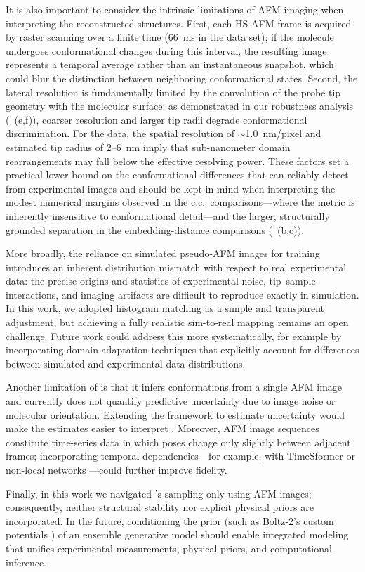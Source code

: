 It is also important to consider the intrinsic limitations of AFM imaging when interpreting the reconstructed structures.
First, each HS-AFM frame is acquired by raster scanning over a finite time (66~ms in the \flhac data set); if the molecule undergoes conformational changes during this interval, the resulting image represents a temporal average rather than an instantaneous snapshot, which could blur the distinction between neighboring conformational states.
Second, the lateral resolution is fundamentally limited by the convolution of the probe tip geometry with the molecular surface; as demonstrated in our robustness analysis (~(e,f)), coarser resolution and larger tip radii degrade conformational discrimination.
For the \flhac data, the spatial resolution of $\sim$1.0~nm/pixel and estimated tip radius of 2--6~nm imply that sub-nanometer domain rearrangements may fall below the effective resolving power.
These factors set a practical lower bound on the conformational differences that \Model can reliably detect from experimental images and should be kept in mind when interpreting the modest numerical margins observed in the c.c.\ comparisons---where the metric is inherently insensitive to conformational detail---and the larger, structurally grounded separation in the embedding-distance comparisons (~(b,c)).

More broadly, the reliance on simulated pseudo-AFM images for training introduces an inherent distribution mismatch with respect to real experimental data: the precise origins and statistics of experimental noise, tip--sample interactions, and imaging artifacts are difficult to reproduce exactly in simulation.
In this work, we adopted histogram matching as a simple and transparent adjustment, but achieving a fully realistic sim-to-real mapping remains an open challenge.
Future work could address this more systematically, for example by incorporating domain adaptation techniques that explicitly account for differences between simulated and experimental data distributions.

Another limitation of \Model is that it infers conformations from a single AFM image and currently does not quantify predictive uncertainty due to image noise or molecular orientation. 
Extending the framework to estimate uncertainty would make the estimates easier to interpret \cite{Kendall2017Uncertainty}.
Moreover, AFM image sequences constitute time-series data in which poses change only slightly between adjacent frames; incorporating temporal dependencies---for example, with TimeSformer \cite{Bertasius2021TimeSformer} or non-local networks \cite{Wang2018NonLocalNetworks}---could further improve fidelity.

Finally, in this work we navigated \AFiii's sampling only using AFM images; consequently, neither structural stability nor explicit physical priors are incorporated. 
In the future, conditioning the prior (such as Boltz-2's custom potentials \cite{passaro2025boltz2}) of an ensemble generative model should enable integrated modeling that unifies experimental measurements, physical priors, and computational inference. 
